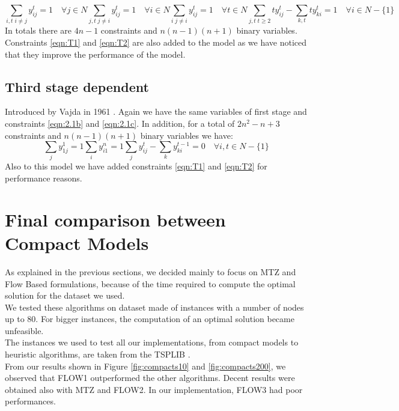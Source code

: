 \begin{subequations} 
	\begin{equation}
		\sum_{i,t \; i \neq j} y_{ij}^t = 1 \quad \forall j \in N
	\end{equation}
	\begin{equation}
		\sum_{j,t \; j \neq i} y_{ij}^t = 1 \quad \forall i \in N
	\end{equation}
	\begin{equation}
		\sum_{i \; j \neq i} y_{ij}^t = 1 \quad \forall t \in N
	\end{equation}
	\begin{equation}
		\sum_{j,t \; t \geq 2} ty_{ij}^t - \sum_{k,t} ty_{ki}^t = 1 \quad \forall i \in N-\lbrace 1 \rbrace
	\end{equation}
\end{subequations}
In totals there are $4n-1$ constraints and $n(n-1)(n+1)$ binary variables. Constraints \ref{eqn:T1} and \ref{eqn:T2} are also added to the model as we have noticed that they improve the performance of the model.

\subsection{Third stage dependent}
Introduced by Vajda in 1961 \cite{timestage3}. Again we have the same variables of first stage and constraints \ref{eqn:2.1b} and \ref{eqn:2.1c}. In addition, 
for a total of $2n^2-n+3$ constraints and $n(n-1)(n+1)$ binary variables we have:
\begin{subequations}
	\begin{equation}
		\sum_{j} y_{1j}^1 = 1
	\end{equation}
	\begin{equation}
		\sum_{i} y_{i1}^n = 1
	\end{equation}
	\begin{equation}
		\sum_{j} y_{ij}^t - \sum_{k} y_{ki}^{t-1} = 0 \quad \forall i,t \in N-\lbrace 1 \rbrace
	\end{equation}
\end{subequations}
Also to this model we have added constraints \ref{eqn:T1} and \ref{eqn:T2} for performance reasons.
\newpage
\section{Final comparison between Compact Models}
As explained in the previous sections, we decided mainly to focus on MTZ and Flow Based formulations, because of the time required to compute the optimal solution for the dataset we used.\\
We tested these algorithms on dataset made of instances with a number of nodes up to 80. For bigger instances, the computation of an optimal solution became unfeasible.\\
The instances we used to test all our implementations, from compact models to heuristic algorithms, are taken from the TSPLIB \cite{tsplib}. \\
From our results shown in Figure \ref{fig:compacts10} and \ref{fig:compacts200}, we observed that FLOW1 outperformed the other algorithms. Decent results were obtained also with MTZ and FLOW2. In our implementation, FLOW3 had poor performances.

